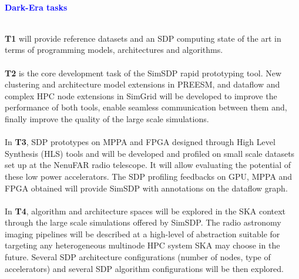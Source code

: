 \documentclass{beamer}
\renewenvironment{block}[1]{%
\begin{Sbox}%
\begin{minipage}[t]{\textwidth}
~\\
\textcolor{blue}{\quad #1}~\\
~\\%
\vspace{0.5cm}
} 
{%
\end{minipage}
\end{Sbox}\Ovalbox{\TheSbox}%
}
\begin{document}
{\begin{columns}[t]
\begin{column}{.49\linewidth}
\begin{block}{\large \textbf{Dark-Era tasks}}
\begin{minipage}{0.95\textwidth}
  
    \textbf{T1} will provide reference datasets and an SDP computing state of the art in terms of programming models, architectures and algorithms.\\
    \\
    \textbf{T2} is the core development task of the SimSDP rapid prototyping tool. New clustering and architecture model extensions in PREESM, and dataflow and complex HPC node extensions in SimGrid will be developed to improve the performance of both tools, enable seamless communication between them and, finally improve the quality of the large scale simulations.\\
    \\
In \textbf{T3}, SDP prototypes on MPPA and FPGA designed through High Level Synthesis (HLS) tools and will be developed and profiled on small scale datasets set up at the NenuFAR radio telescope. It will allow evaluating the potential of these low power accelerators. The SDP profiling feedbacks on GPU, MPPA and FPGA obtained will provide SimSDP with annotations on the dataflow graph. \\%
\\
In \textbf{T4}, algorithm and architecture spaces will be explored in the SKA context through the large scale simulations offered by SimSDP. The radio astronomy imaging pipelines will be described at a high-level of abstraction suitable for targeting any heterogeneous multinode HPC system SKA may choose in the future. Several SDP architecture configurations (number of nodes, type of accelerators) and several SDP algorithm configurations will be then explored. 
\end{minipage}
\end{block}
\end{column}
\end{columns}
}
\end{document}
